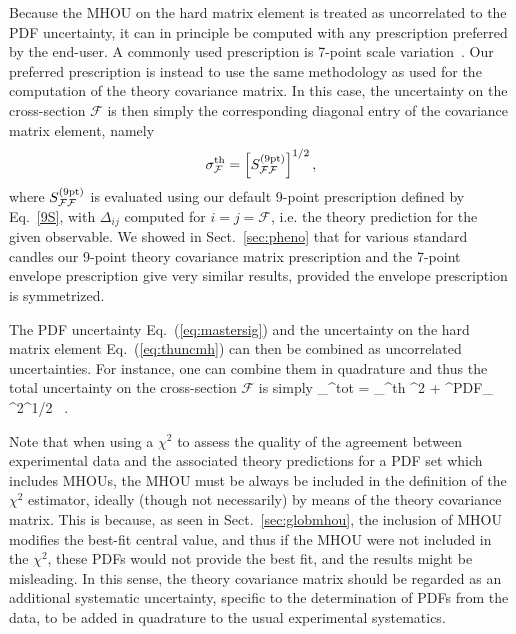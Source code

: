 Because the MHOU on the hard matrix element is treated as uncorrelated
to the PDF uncertainty, it can in principle be computed with any
prescription preferred by the end-user.
%
A commonly used
prescription is 7-point scale variation~\cite{deFlorian:2016spz}.
%
Our preferred prescription is instead to use the same methodology as used for
the computation of the theory covariance matrix.
%
In this case, the uncertainty on
the cross-section $\mathcal{F}$ is then simply the corresponding diagonal 
entry of the covariance matrix element, namely
\begin{equation}\label{eq:thuncmh}
\sigma_{\mathcal{F}}^{\rm th} = \left[S^{(\rm 9pt)}_{{\mathcal{F}}{\mathcal{F}}}\right]^{1/2},
\end{equation}
where $S^{(\rm 9pt)}_{{\mathcal{F}}{\mathcal{F}}}$ is evaluated using  our default
9-point prescription defined by
Eq.~\eqref{9S}, with $\Delta_{ij}$ computed for $i=j=\mathcal{F}$,
i.e. the theory prediction for the given observable.
%
We showed in 
Sect.~\ref{sec:pheno} that for various standard candles our 9-point theory 
covariance matrix prescription and the 7-point envelope prescription give 
very similar results, provided the envelope prescription is symmetrized.

The PDF uncertainty Eq.~(\ref{eq:mastersig}) and the uncertainty on
the hard matrix element Eq.~(\ref{eq:thuncmh}) can then be combined as
uncorrelated uncertainties.
%
For instance, one can combine them in quadrature and thus the total
uncertainty on the cross-section $\mathcal{F}$ is simply
\be
\sigma_{}^{\rm tot} = \lp \lp \sigma_{}^{\rm th} \rp^2 + \lp \sigma^{\rm PDF}_{}
\rp^2\rp^{1/2} \, .
\ee

Note that when using a $\chi^2$ to assess the quality of the agreement between 
experimental data and the associated theory predictions for a PDF set which includes MHOUs, the MHOU must be always be included in the definition of the 
$\chi^2$ estimator, ideally (though not necessarily) by means of the 
theory covariance matrix.
%
This is because, as seen in Sect.~\ref{sec:globmhou}, the inclusion of 
MHOU modifies the best-fit central value, and thus if the MHOU were 
not included in the $\chi^2$, these PDFs would not provide the best fit, and 
the results might be misleading.
%
In this sense, the theory covariance matrix should be regarded as an 
additional systematic uncertainty, specific to the determination of PDFs 
from the data, to be added in quadrature to the usual experimental systematics.

